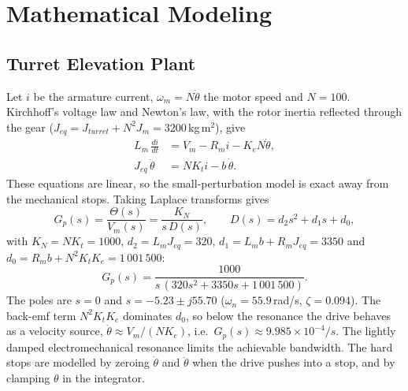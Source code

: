 \documentclass[conference]{IEEEtran}
\begin{document}
\section{Mathematical Modeling}
\subsection{Turret Elevation Plant}
\label{sec:plant}
Let $i$ be the armature current, $\omega_m=N\dot\theta$ the motor speed and
$N=100$. Kirchhoff's voltage law and Newton's law, with the rotor inertia
reflected through the gear ($J_{eq}=J_{turret}+N^2J_m=3200$\,kg\,m$^2$), give
\begin{align}
L_m\,\frac{di}{dt} &= V_m - R_m i - K_e N\dot\theta, \label{eq:elec}\\
J_{eq}\,\ddot\theta &= N K_t i - b\,\dot\theta. \label{eq:mech}
\end{align}
These equations are linear, so the small-perturbation model is exact away from
the mechanical stops. Taking Laplace transforms gives
\begin{equation}
G_p(s)=\frac{\Theta(s)}{V_m(s)}=\frac{K_N}{s\,D(s)},\qquad
D(s)=d_2s^2+d_1s+d_0,
\label{eq:Gp}
\end{equation}
with $K_N=NK_t=1000$, $d_2=L_mJ_{eq}=320$, $d_1=L_mb+R_mJ_{eq}=3350$ and
$d_0=R_mb+N^2K_tK_e=1\,001\,500$:
\begin{equation}
G_p(s)=\frac{1000}{s\,(320s^2+3350s+1\,001\,500)}.
\end{equation}
The poles are $s=0$ and $s=-5.23\pm j55.70$ ($\omega_n=55.9$\,rad/s,
$\zeta=0.094$). The back-emf term $N^2K_tK_e$ dominates $d_0$, so below the
resonance the drive behaves as a velocity source,
$\dot\theta\approx V_m/(NK_e)$, i.e.\ $G_p(s)\approx 9.985\times10^{-4}/s$.
The lightly damped electromechanical resonance limits the achievable bandwidth.
The hard stops are modelled by zeroing $\dot\theta$ and $\ddot\theta$ when the
drive pushes into a stop, and by clamping $\theta$ in the integrator.
\end{document}
